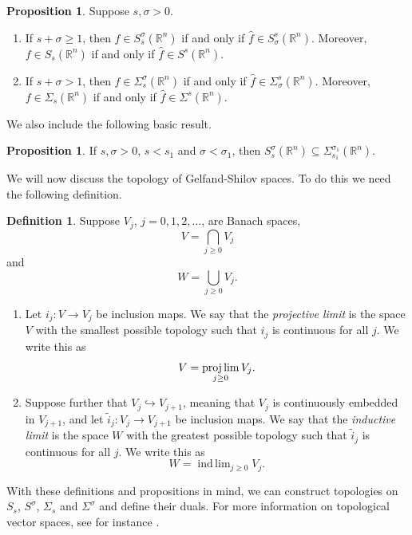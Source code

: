 \documentclass[11pt,a4paper,reqno]{amsart}
\numberwithin{equation}{section}
\theoremstyle{definition}
\newtheorem{prop}[thm]{Proposition}
\theoremstyle{definition}
\newtheorem{definition}[thm]{Definition}
\DeclareMathOperator*{\indlim}{ind\,lim}
\begin{document}
\begin{prop} \label{prop:FT}
Suppose $s,\sigma>0$. 
\begin{enumerate}[label=(\alph*)]
    \item If $s+\sigma\geq 1$, then $f\in S_s^\sigma(\mathbb{R}^n)$ if and only if $\hat{f}\in S_\sigma^s(\mathbb{R}^n)$. Moreover, $f\in S_s(\mathbb{R}^n)$ if and only if $\hat{f}\in S^s(\mathbb{R}^n)$.
    \item If $s+\sigma>1$, then $f\in\Sigma_s^\sigma(\mathbb{R}^n)$ if and only if $\hat{f}\in\Sigma_\sigma^s(\mathbb{R}^n)$. Moreover, $f\in \Sigma_s(\mathbb{R}^n)$ if and only if $\hat{f}\in \Sigma^s(\mathbb{R}^n)$.
\end{enumerate}
\end{prop}
We also include the following basic result.
\begin{prop}\label{prop:SsubSig}
If $s,\sigma >0$, $s<s_1$ and $\sigma<\sigma_1$, then $S_s^\sigma(\mathbb{R}^n) \subseteq \Sigma_{s_1}^{\sigma_1}(\mathbb{R}^n)$.
\end{prop}
We will now discuss the topology of Gelfand-Shilov spaces. To do this we need the following definition.
\begin{definition}\label{def:indproj}
Suppose $V_j$,  $j=0,1,2,\dots $, are Banach spaces, $$V= \bigcap_{j\geq 0} V_j$$ and $$W = \bigcup_{j\geq 0} V_j.$$
\begin{enumerate}[label=(\alph*)]
    \item Let $i_j:V\rightarrow V_j $ be inclusion maps. We say that the \emph{projective limit}  is the space $V$ with the smallest possible topology such that $i_j$ is continuous for all $j$. We write this as
    $$ V = \projlim_{j\geq 0} V_j. $$ 
    \item Suppose further that $V_j\hookrightarrow V_{j+1}$, meaning that $V_j$ is continuously embedded in $V_{j+1}$, and let $\tilde{i}_j:V_j \rightarrow V_{j+1}$ be inclusion maps. We say that the \emph{inductive limit} is the space $W$ with the greatest possible topology such that $\tilde{i}_j$ is continuous for all $j$. We write this as
    $$ W = \indlim_{j\geq 0} V_j. $$
\end{enumerate}
\end{definition}
With these definitions and propositions in mind, we can construct topologies on $S_s$, $S^\sigma$, $\Sigma_s$ and $\Sigma^\sigma$ and define their duals. For more information on topological vector spaces, see for instance \cite{Schaefer}.
\end{document}
